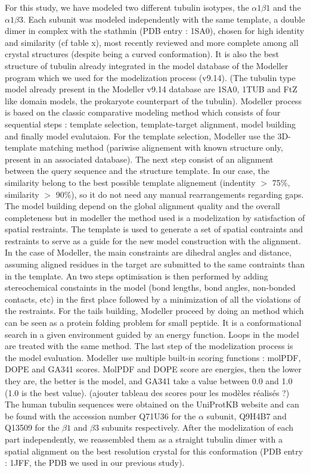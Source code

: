\documentclass[a4paper]{article}
\begin{document}
For this study, we have modeled two different tubulin isotypes, the $\alpha1\beta1$ and the $\alpha1\beta3$. Each
subunit was modeled independently with the same template, a double dimer in complex with the stathmin
(PDB entry : 1SA0), chosen for high identity and similarity (cf table x), most recently reviewed and more complete
among all crystal structures (despite being a curved conformation). It is also the best structure of tubulin
already integrated in the model database of the Modeller program which we used for the modelization process (v9.14).
(The tubulin type model already present in the Modeller v9.14 database are 1SA0, 1TUB and FtZ like domain models, the
prokaryote counterpart of the tubulin).
Modeller process is based on the classic comparative modeling method which consists of four
sequential steps : template selection, template-target alignment, model building and finally
model evalutaion. For the template selection, Modeller use the 3D-template matching method
(pariwise alignement with known structure only, present in an associated database). The next
step consist of an alignment between the query sequence and the structure template. In our
case, the similarity belong to the best possible template alignement (indentity $>$ 75\%, similarity $>$ 90\%),
so it do not need any manual
rearrangements regarding gaps. The model building depend on the global alignment quality and the overall
completeness but in modeller the method used is a modelization by satisfaction of spatial restraints.
The template is used to generate a set of spatial contraints and restraints to serve as a guide for
the new model construction with the alignment. In the case of Modeller, the main constraints are
dihedral angles and distance, assuming aligned residues in the target are submitted to the same contraints
than in the template. An two steps optimisation is then performed by adding stereochemical constaints in the
model (bond lengths, bond angles, non-bonded contacts, etc) in the first place followed by a minimization
of all the violations of the restraints. For the tails building, Modeller proceed by doing an 
method which can be seen as a protein folding problem for small peptide. It is a conformational search
in a given environment guided by an energy function. Loops in the model are treated with the same method.
The last step of the modelization process is the model evaluation. Modeller use multiple built-in scoring
functions : molPDF, DOPE and GA341 scores. MolPDF and DOPE score are energies, then the lower they are, the better
is the model, and GA341 take a value between 0.0 and 1.0 (1.0 is the best value). (ajouter tableau des scores
pour les modèles réalisés ?)
The human tubulin sequences were obtained on the UniProtKB
website and can be found with the accession number Q71U36 for the $\alpha$ subunit, Q9H4B7 and Q13509
for the $\beta1$ and $\beta3$ subunits respectively. After the modelization of each part independently, we reassembled them
as a straight tubulin dimer with a spatial alignment on the best resolution crystal for this conformation
(PDB entry : 1JFF, the PDB we used in our previous study).
\end{document}
